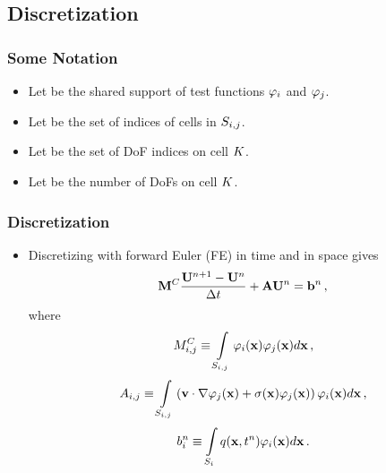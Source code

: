 \subsection{Discretization}
\begin{frame}
\frametitle{Some Notation}

\begin{minipage}{0.49\textwidth}
  \begin{itemize}
    \item Let \hlorange{$\support\ij$} be the shared support of test functions
      $\varphi_i$ and $\varphi_j$.
    \item Let \hlorange{$\cellindices(\support\ij)$} be the set of indices of
      cells in $\support\ij$.
  \end{itemize}
  
\end{minipage}
\begin{minipage}{0.49\textwidth}
  \begin{itemize}
    \item Let \hlorange{$\indices(\cell)$} be the set of DoF indices on cell $K$.
    \item Let  be the number of DoFs on cell $K$.
  \end{itemize}
  
\end{minipage}

\end{frame}
\begin{frame}
\frametitle{Discretization}

\begin{itemize}
   \item Discretizing with forward Euler (FE) in time and 
      in space gives
   \begin{equation}
      \consistentmassmatrix\frac{\solutionvector^{n+1}-\solutionvector^n}
        {\dt} + \ssmatrix\solutionvector^n = \ssrhs^n \eqc
   \end{equation}
   where
   \begin{equation}
     M_{i,j}^C \equiv \int\limits_{S_{i,j}}
       \varphi_i(\mathbf{x}) \varphi_j(\mathbf{x}) d\mathbf{x} \,,
   \end{equation}
   \begin{equation}
     A_{i,j} \equiv \int\limits_{S_{i,j}}\left(
       \mathbf{v}\cdot\nabla\varphi_j(\mathbf{x}) +
		\sigma(\mathbf{x})\varphi_j(\mathbf{x})\right)\varphi_i(\mathbf{x}) d\mathbf{x} \,,
   \end{equation}
   \begin{equation}
      b_i^n \equiv \int\limits_{S_i} q(\mathbf{x},t^n)\varphi_i(\mathbf{x}) d\mathbf{x} \,.
   \end{equation}
\end{itemize}

\end{frame}
